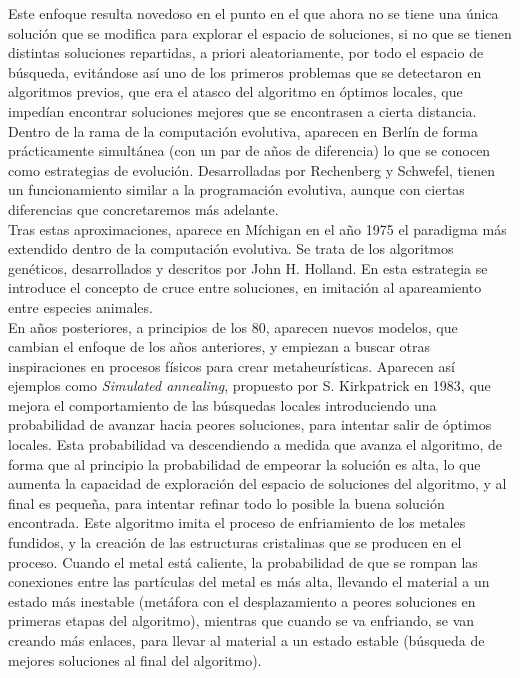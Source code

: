 \documentclass[12pt]{article} \usepackage[utf8x]{inputenc}
\begin{document}
Este enfoque resulta novedoso en el punto en el que ahora no se tiene
una única solución que se modifica para explorar el espacio de
soluciones, si no que se tienen distintas soluciones repartidas, a
priori aleatoriamente, por todo el espacio de búsqueda, evitándose así
uno de los primeros problemas que se detectaron en algoritmos previos,
que era el atasco del algoritmo en óptimos locales, que impedían
encontrar soluciones mejores que se encontrasen a cierta distancia.\\

Dentro de la rama de la computación evolutiva, aparecen en Berlín de
forma prácticamente simultánea (con un par de años de diferencia) lo
que se conocen como estrategias de evolución. Desarrolladas por
Rechenberg y Schwefel, tienen un funcionamiento similar a la
programación evolutiva, aunque con ciertas diferencias que
concretaremos más adelante.\\

Tras estas aproximaciones, aparece en Míchigan en el año 1975 el
paradigma más extendido dentro de la computación evolutiva. Se trata
de los algoritmos genéticos, desarrollados y descritos por John H.
Holland. En esta estrategia se introduce el concepto de cruce entre
soluciones, en imitación al apareamiento entre especies animales.\\

En años posteriores, a principios de los 80, aparecen nuevos modelos,
que cambian el enfoque de los años anteriores, y empiezan a buscar
otras inspiraciones en procesos físicos para crear metaheurísticas.
Aparecen así ejemplos como \textit{Simulated annealing}, propuesto por
S. Kirkpatrick en 1983, que mejora el comportamiento de las búsquedas
locales introduciendo una probabilidad de avanzar hacia peores
soluciones, para intentar salir de óptimos locales. Esta probabilidad
va descendiendo a medida que avanza el algoritmo, de forma que al
principio la probabilidad de empeorar la solución es alta, lo que
aumenta la capacidad de exploración del espacio de soluciones del
algoritmo, y al final es pequeña, para intentar refinar todo lo
posible la buena solución encontrada. Este algoritmo imita el proceso
de enfriamiento de los metales fundidos, y la creación de las
estructuras cristalinas que se producen en el proceso. Cuando el metal
está caliente, la probabilidad de que se rompan las conexiones entre
las partículas del metal es más alta, llevando el material a un estado
más inestable (metáfora con el desplazamiento a peores soluciones en
primeras etapas del algoritmo), mientras que cuando se va enfriando,
se van creando más enlaces, para llevar al material a un estado
estable (búsqueda de mejores soluciones al final del algoritmo).\\
\end{document}
